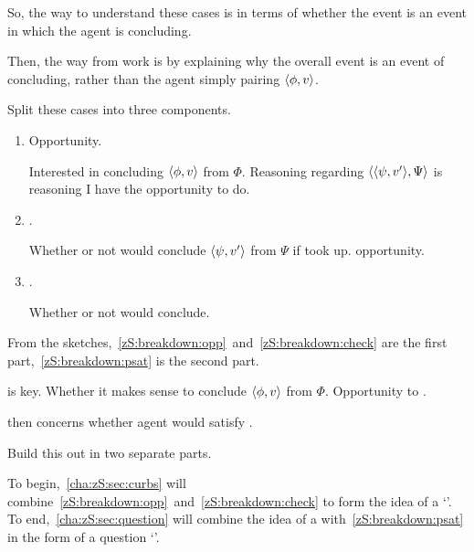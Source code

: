 \begin{note}
  So, the way to understand these cases is in terms of whether the event is an event in which the agent is concluding.

  Then, the way  from  work is by explaining why the overall event is an event of concluding, rather than the agent simply pairing \(\langle \phi, v \rangle\).
\end{note}

\begin{note}
  Split these cases into three components.
  \begin{enumerate}[label=\Roman*., ref=(\Roman*)]
  \item
    \label{zS:breakdown:opp}
    Opportunity.

    Interested in concluding \(\langle \phi, v \rangle\) from \(\Phi\).
    Reasoning regarding \(\langle \langle \psi, v' \rangle, \Psi \rangle\) is reasoning I have the opportunity to do.
  \item
    \label{zS:breakdown:check}
    .

    Whether or not would conclude \(\langle \psi, v' \rangle\) from \(\Psi\) if took up. opportunity.
  \item
    \label{zS:breakdown:psat}
    .

    Whether or not would conclude.
  \end{enumerate}

  From the sketches,~\ref{zS:breakdown:opp}~and~\ref{zS:breakdown:check} are the first part,~\ref{zS:breakdown:psat} is the second part.

   is key.
  Whether it makes sense to conclude \(\langle \phi, v \rangle\) from \(\Phi\).
  Opportunity to .

   then concerns whether agent would satisfy .
\end{note}

\begin{note}
  Build this out in two separate parts.

  To begin,~\autoref{cha:zS:sec:curbs} will combine~\ref{zS:breakdown:opp}~and~\ref{zS:breakdown:check} to form the idea of a `\curb{}'.
  To end,~\ref{cha:zS:sec:question} will combine the idea of a \curb{} with~\ref{zS:breakdown:psat} in the form of a question `\qzS{}'.
\end{note}

\section{}
\label{cha:zS:sec:curbs}

